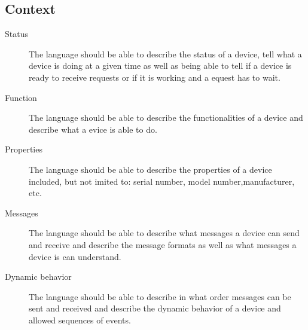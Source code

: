 \subsection{Context}
\label{sec:Context}

\begin{description}
	\item[Status] The language should be able to describe the status of a device, tell what a device is doing at a given time as well as being able to tell if a device is ready to receive requests or if it is working and a  equest has to wait.

	\item[Function] The language should be able to describe the functionalities of a device and describe what a  evice is able to do.


	\item[Properties] The language should be able to describe the properties of a device included, but not  imited to: serial number, model number,manufacturer, etc.

	\item[Messages] The language should be able to describe what messages a device can send and receive and describe the message formats as well as what messages a device is can understand.

	\item[Dynamic behavior] The language should be able to describe in what order messages can be sent and received and describe the dynamic behavior of a device and allowed sequences of events.

\end{description}
